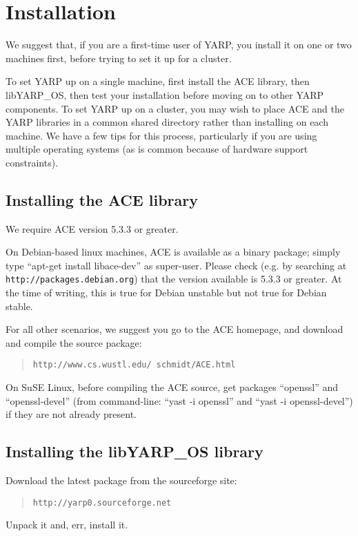 
\section{Installation}

\label{sect:install}

We suggest that, if you are a first-time user of YARP, you install it
on one or two machines first, before trying to set it up for a cluster.

To set YARP up on a single machine, first install the ACE library,
then libYARP\_OS, then test your installation before moving on to 
other YARP components.  To set YARP up on a cluster, you may 
wish to place ACE and the YARP libraries in a common shared directory
rather than installing on each machine.  We have a few tips for this 
process, particularly if you are using multiple operating systems (as
is common because of hardware support constraints).

\subsection{Installing the ACE library}

We require ACE version 5.3.3 or greater.

On Debian-based linux machines, ACE is available as a binary package;
simply type ``apt-get install libace-dev'' as super-user.  Please
check (e.g. by searching at {\tt http://packages.debian.org}) that the version available is 5.3.3 or greater.  At the time of
writing, this is true for Debian unstable but not true for Debian
stable.

For all other scenarios, we suggest you go to the ACE homepage, and
download and compile the source package:

\begin{quote}
{\tt http://www.cs.wustl.edu/~schmidt/ACE.html}
\end{quote}

On SuSE Linux, before compiling the ACE source, get packages ``openssl'' and
``openssl-devel'' (from command-line: ``yast -i openssl'' and ``yast
-i openssl-devel'') if they are not already present.


\subsection{Installing the libYARP\_OS library}


Download the latest package from the sourceforge site:

\begin{quote}
{\tt http://yarp0.sourceforge.net}
\end{quote}

Unpack it and, err, install it.

